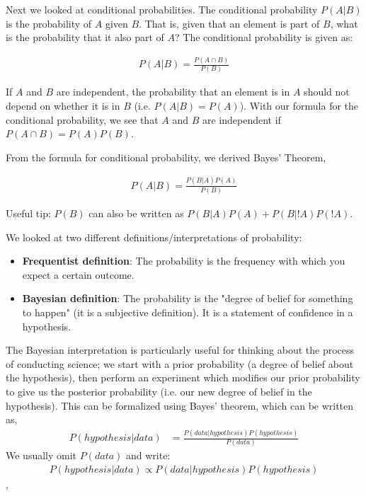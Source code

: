 Next we looked at conditional probabilities. The conditional probability $P(A|B)$ is the probability of $A$ given $B$. That is, given that an element is part of $B$, what is the probability that it also part of $A$? The conditional probability is given as:

\begin{align*}
P(A|B) = \frac{P(A \cap B)}{P(B)}
\end{align*}

If $A$ and $B$ are independent, the probability that an element is in $A$ should not depend on whether it is in $B$ (i.e. $P(A|B)=P(A)$). With our formula for the conditional probability, we see that $A$ and $B$ are independent if $P(A \cap B)=P(A)P(B)$.

From the formula for conditional probability, we derived Bayes' Theorem,

\begin{align*}
P(A|B) = \frac{P(B|A)P(A)}{P(B)}
\end{align*}

Useful tip: $P(B)$ can also be written as $P(B|A)P(A)+P(B|!A)P(!A)$.

We looked at two different definitions/interpretations of probability:
\begin{itemize}
\item \textbf{Frequentist definition}: The probability is the frequency with which you expect a certain outcome.
\item \textbf{Bayesian definition}: The probability is the "degree of belief for something to happen" (it is a subjective definition). It is a statement of confidence in a hypothesis.
\end{itemize}

The Bayesian interpretation is particularly useful for thinking about the process of conducting science; we start with a prior probability (a degree of belief about the hypothesis), then perform an experiment which modifies our prior probability to give us the posterior probability (i.e. our new degree of belief in the hypothesis). This can be formalized using Bayes' theorem, which can be written as,
\begin{align*}
P(hypothesis|data) &= \frac{P(data | hypothesis)P(hypothesis)}{P(data)}
\end{align*}
We usually omit $P(data)$ and write:
\begin{align*}
P(hypothesis|data) \propto P(data | hypothesis)P(hypothesis)
\end{align*},

